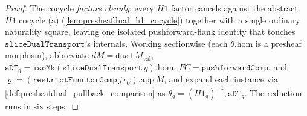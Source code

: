 \begin{proof}
  \leanok
  The cocycle \emph{factors cleanly}: every \(H1\) factor cancels against the abstract \(H1\) cocycle
  (a) (\cref{lem:presheafdual_h1_cocycle}) together with a single ordinary naturality square, leaving
  one isolated pushforward-flank identity that touches \(\mathtt{sliceDualTransport}\)'s internals.
  Working sectionwise (each \(\theta.\mathrm{hom}\) is a presheaf morphism), abbreviate
  \(dM = \mathtt{dual}\,M_{\mathrm{val}}\),
  \(\mathtt{sDT}_g = \mathtt{isoMk}(\mathtt{sliceDualTransport}\,g).\mathrm{hom}\),
  \(FC = \mathtt{pushforwardComp}\), and
  \(\varrho = (\mathtt{restrictFunctorComp}\,j\,\iota_U).\mathrm{app}\,M\), and expand each instance via
  \cref{def:presheafdual_pullback_comparison} as
  \(\theta_g = (H1_g)^{-1} \mathbin{;} \mathtt{sDT}_g\). The reduction runs in six steps.

\end{proof}
